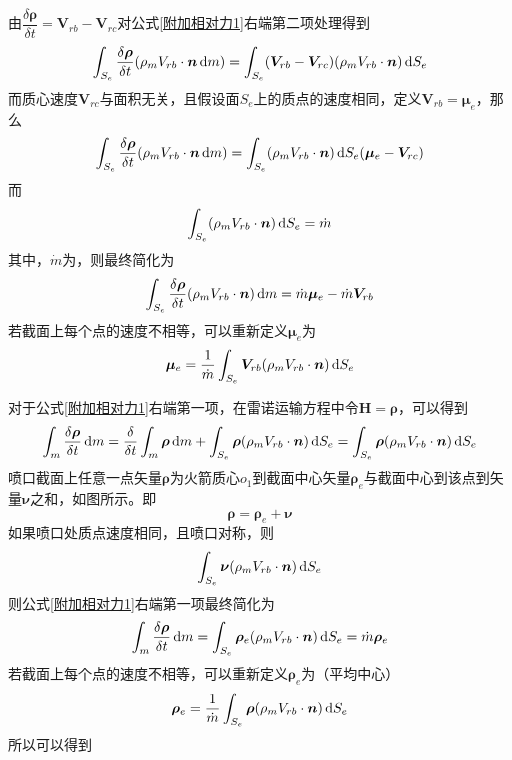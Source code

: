 由$\dfrac{\delta \bm{\rho}}{\delta t} = \bm{V}_{rb} - \bm{V}_{rc}$对公式\eqref{附加相对力1}右端第二项处理得到
\begin{align*}
	 \int_{S_e} \dfrac{\delta \bm{\rho}}{\delta t} (\rho_m V_{rb}\cdot \bm{n} \, {\rm{d}} m)
	  = \int_{S_e} (\bm{V}_{rb} - \bm{V}_{rc}) (\rho_m V_{rb}\cdot \bm{n}) \, {\rm{d}} S_{e}
\end{align*}
而质心速度$\bm{V}_{rc}$与面积无关，且假设面$S_e$上的质点的速度相同，定义$\bm{V}_{rb} = \bm{\mu}_e$，那么
\begin{align*}
	\int_{S_e} \dfrac{\delta \bm{\rho}}{\delta t} (\rho_m V_{rb}\cdot \bm{n} \, {\rm{d}} m)
	= \int_{S_e} (\rho_m V_{rb}\cdot \bm{n}) \, {\rm{d}} S_{e} (\bm{\mu}_e - \bm{V}_{rc})
\end{align*}
而
\begin{equation*}
	\int_{S_e} (\rho_m V_{rb}\cdot \bm{n}) \, {\rm{d}} S_{e} = \dot{m}
\end{equation*}
其中，$\dot{m}$为，则最终简化为
\begin{equation}
	\int_{S_e} \dfrac{\delta \bm{\rho}}{\delta t} (\rho_m V_{rb}\cdot \bm{n} )\, {\rm{d}} m
	= \dot{m}\bm{\mu}_e - \dot{m} \bm{V}_{rb}
\end{equation}
若截面上每个点的速度不相等，可以重新定义$\bm{\mu}_e$为
\begin{equation}
	\bm{\mu}_e = \dfrac{1}{\dot{m}}\int_{S_e}\bm{V}_{rb} (\rho_m V_{rb}\cdot \bm{n}) \, {\rm{d}} S_{e}
\end{equation}

对于公式\eqref{附加相对力1}右端第一项，在雷诺运输方程中令$\bm{H} = \bm{\rho}$，可以得到
\begin{equation*}
	\int_m \dfrac{\delta \bm{\rho}}{\delta t} \, {\rm{d}} m= \dfrac{\delta}{\delta t}\int_m \bm{\rho} \, {\rm{d}} m + \int_{S_e}  \bm{\rho}  (\rho_m V_{rb}\cdot \bm{n}) \, {\rm{d}} S_{e} =  \int_{S_e}  \bm{\rho}  (\rho_m V_{rb}\cdot \bm{n}) \, {\rm{d}} S_{e} 
\end{equation*}
喷口截面上任意一点矢量$\bm{\rho}$为火箭质心$o_1$到截面中心矢量$\bm{\rho}_e$与截面中心到该点到矢量$\bm{\nu}$之和，如图所示。即
\begin{equation}
	\bm{\rho} = \bm{\rho}_e + \bm{\nu}
\end{equation}
如果喷口处质点速度相同，且喷口对称，则
\begin{equation*}
	\int_{S_e}  \bm{\nu}  (\rho_m V_{rb}\cdot \bm{n}) \, {\rm{d}} S_{e} 
\end{equation*}
则公式\eqref{附加相对力1}右端第一项最终简化为
\begin{equation}
		\int_m \dfrac{\delta \bm{\rho}}{\delta t} \, {\rm{d}} m= \int_{S_e}  \bm{\rho}_e  (\rho_m V_{rb}\cdot \bm{n}) \, {\rm{d}} S_{e}  = \dot{m}\bm{\rho}_e
		\label{质量秒耗量}
\end{equation}
若截面上每个点的速度不相等，可以重新定义$\bm{\rho}_e$为（平均中心）
\begin{equation}
	\bm{\rho}_e = \dfrac{1}{\dot{m}}\int_{S_e}\bm{\rho} (\rho_m V_{rb}\cdot \bm{n}) \, {\rm{d}} S_{e}
\end{equation}
所以可以得到

